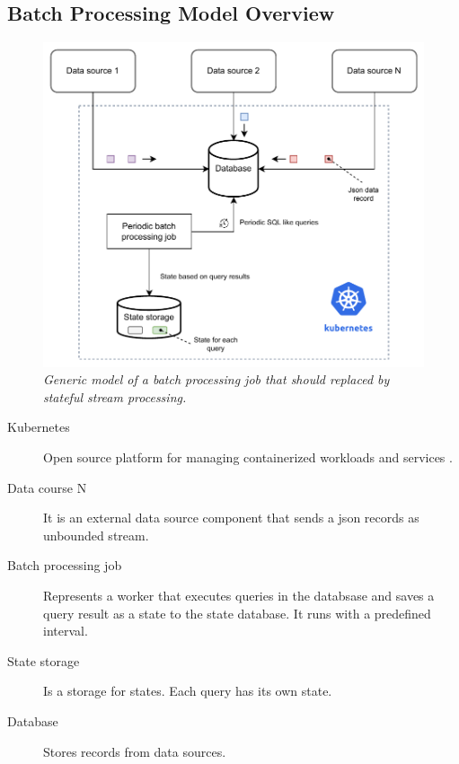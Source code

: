 \subsection{Batch Processing Model Overview}\label{subsec:current-model}

\begin{figure}[ht]
    \centering
    \includegraphics[width=1\textwidth]{figures/current-model-2}
    \caption{\textit{Generic model of a batch processing job that should replaced by stateful stream processing.}}
    \label{fig:current-model}
\end{figure}


\begin{description}
    \item[Kubernetes] Open source platform for managing containerized workloads and services \cite{kubernetes_intro}.
    \item[Data course N] It is an external data source component that sends a json records as unbounded stream.
    \item[Batch processing job] Represents a worker that executes queries in the databsase
     and saves a query result as a state to the state database.
    It runs with a predefined interval.
    \item[State storage] Is a storage for states.
    Each query has its own state.
    \item[Database] Stores records from data sources.
\end{description}

